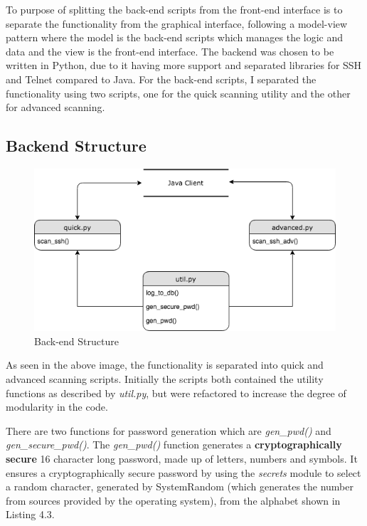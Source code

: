 To purpose of splitting the back-end scripts from the front-end interface is to separate the functionality from the graphical interface, following a model-view pattern where the model is the back-end scripts which manages the logic and data and the view is the front-end interface. The backend was chosen to be written in Python, due to it having more support and separated libraries for SSH and Telnet compared to Java. For the back-end scripts, I separated the functionality using two scripts, one for the quick scanning utility and the other for advanced scanning.

\subsection{Backend Structure}

\begin{figure}[h]
	\centering
	\includegraphics[width=1\linewidth]{img/backend_structure.png}
	\caption{Back-end Structure}
\end{figure}

As seen in the above image, the functionality is separated into quick and advanced scanning scripts. Initially the scripts both contained the utility functions as described by \textit{util.py}, but were refactored to increase the degree of modularity in the code.

\vspace{0.5cm}

There are two functions for password generation which are \textit{gen\_pwd()} and \textit{gen\_secure\_pwd()}. The \textit{gen\_pwd()} function generates a \textbf{cryptographically secure} 16 character long password, made up of letters, numbers and symbols. It ensures a cryptographically secure password by using the \textit{secrets} module to select a random character, generated by SystemRandom (which generates the number from sources provided by the operating system), from the alphabet shown in Listing 4.3.

